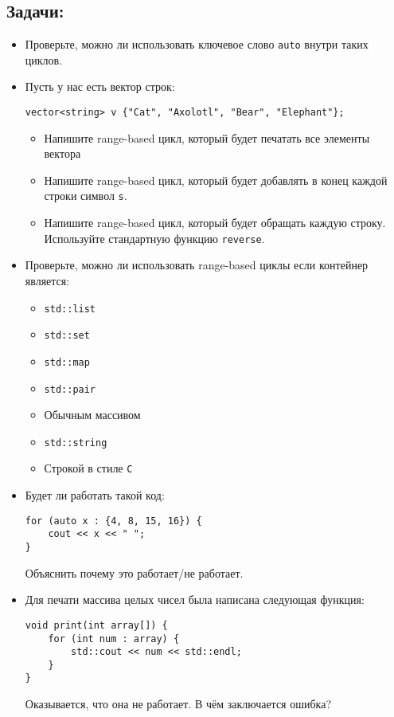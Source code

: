 \documentclass{article}
\begin{document}
\subsection*{Задачи:}
\begin{itemize}
\item Проверьте, можно ли использовать ключевое слово \texttt{auto} внутри таких циклов.
\item Пусть у нас есть вектор строк:
\begin{lstlisting}
vector<string> v {"Cat", "Axolotl", "Bear", "Elephant"};
\end{lstlisting}
\begin{itemize}
\item Напишите range-based цикл, который будет печатать все элементы вектора
\item Напишите range-based цикл, который будет добавлять в конец каждой строки символ \texttt{s}.
\item Напишите range-based цикл, который будет обращать каждую строку. Используйте стандартную функцию \texttt{reverse}.
\end{itemize}

\item Проверьте, можно ли использовать range-based циклы если контейнер является:
\begin{multicols}{2}
\begin{itemize}
\item \texttt{std::list}
\item \texttt{std::set}
\item \texttt{std::map}
\item \texttt{std::pair}
\item Обычным массивом
\item \texttt{std::string}
\item Строкой в стиле \texttt{C}
\end{itemize}
\end{multicols}

\item Будет ли работать такой код:
\begin{lstlisting}
for (auto x : {4, 8, 15, 16}) {
    cout << x << " ";
}
\end{lstlisting}
Объяснить почему это работает/не работает.

\item Для печати массива целых чисел была написана следующая функция:
\begin{lstlisting}
void print(int array[]) {
    for (int num : array) {
        std::cout << num << std::endl;
    }
}
\end{lstlisting}
Оказывается, что она не работает. В чём заключается ошибка?
\end{itemize}
\end{document}
